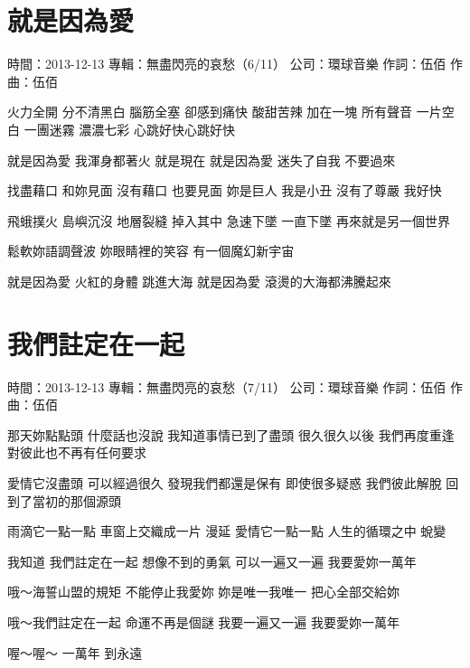 \documentclass[UTF8,a4paper,oneside,twocolumn,12pt]{ctexbook}
\newcommand{\infopair}[2]{\textbullet #1：#2}
\newcommand{\zc}[1][伍佰]{\infopair{作詞}{#1}}
\newcommand{\zq}[1][伍佰]{\infopair{作曲}{#1}}
\newcommand{\zj}[1]{\infopair{專輯}{#1}}
\newcommand{\sj}[1]{\infopair{時間}{#1}}
\newcommand{\gs}[1]{\infopair{公司}{#1}}
\newenvironment{info}{\begin{flushleft}\kaishu
	}
	{\end{flushleft}\normalsize\yahei\par}
\newenvironment{lyric}{
	}
{}
\begin{document}
\section{就是因為愛}
\begin{info}
	\sj{2013-12-13}
	\zj{無盡閃亮的哀愁（6/11）}
	\gs{環球音樂}
	\zc
	\zq
\end{info}
\begin{lyric}
	火力全開 分不清黑白
	腦筋全塞 卻感到痛快
	酸甜苦辣 加在一塊
	所有聲音 一片空白
	一團迷霧 濃濃七彩
	心跳好快心跳好快

	就是因為愛
	我渾身都著火 就是現在
	就是因為愛
	迷失了自我 不要過來

	找盡藉口 和妳見面
	沒有藉口 也要見面
	妳是巨人 我是小丑
	沒有了尊嚴 我好快

	飛蛾撲火 島嶼沉沒
	地層裂縫 掉入其中
	急速下墜 一直下墜
	再來就是另一個世界

	鬆軟妳語調聲波
	妳眼睛裡的笑容
	有一個魔幻新宇宙

	就是因為愛
	火紅的身體 跳進大海
	就是因為愛
	滾燙的大海都沸騰起來
\end{lyric}

\section{我們註定在一起}
\begin{info}
	\sj{2013-12-13}
	\zj{無盡閃亮的哀愁（7/11）}
	\gs{環球音樂}
	\zc
	\zq
\end{info}
\begin{lyric}
	那天妳點點頭 什麼話也沒說
	我知道事情已到了盡頭
	很久很久以後 我們再度重逢
	對彼此也不再有任何要求

	愛情它沒盡頭 可以經過很久
	發現我們都還是保有
	即使很多疑惑 我們彼此解脫
	回到了當初的那個源頭

	雨滴它一點一點 車窗上交織成一片 漫延
	愛情它一點一點 人生的循環之中 蛻變

	我知道
	我們註定在一起 想像不到的勇氣
	可以一遍又一遍 我要愛妳一萬年

	哦～海誓山盟的規矩 不能停止我愛妳
	妳是唯一我唯一 把心全部交給妳

	哦～我們註定在一起 命運不再是個謎
	我要一遍又一遍 我要愛妳一萬年

	喔～喔～
	一萬年
	到永遠
\end{lyric}
\end{document}
